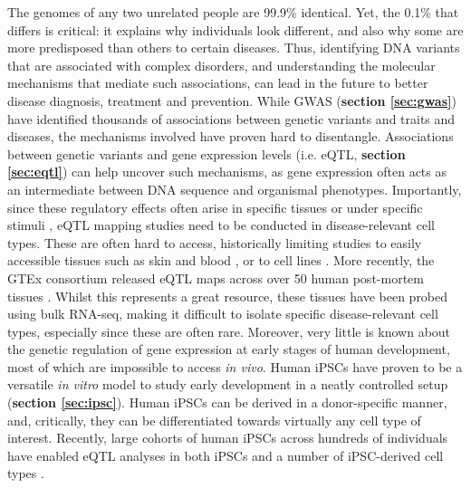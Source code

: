 The genomes of any two unrelated people are 99.9\% identical.
Yet, the 0.1\% that differs is critical: it explains why individuals look different, and also why some are more predisposed than others to certain diseases. 
Thus, identifying DNA variants that are associated with complex disorders, and understanding the molecular mechanisms that mediate such associations, can lead in the future to better disease diagnosis, treatment and prevention.
While GWAS (\textbf{section \ref{sec:gwas}}) have identified thousands of associations between genetic variants and traits and diseases, the mechanisms involved have proven hard to disentangle.
Associations between genetic variants and gene expression levels (i.e. eQTL, \textbf{section 
\ref{sec:eqtl}}) can help uncover such mechanisms, as gene expression often acts as an intermediate between DNA sequence and organismal phenotypes.
Importantly, since these regulatory effects often arise in specific tissues or under specific stimuli \cite{alasoo2018shared}, eQTL mapping studies need to be conducted in disease-relevant cell types. 
These are often hard to access, historically limiting studies to easily accessible tissues such as skin and blood \cite{fairfax2014innate, westra2014genome}, or to cell lines \cite{gibson2005quantitative}.
More recently, the GTEx consortium released eQTL maps across over 50 human post-mortem tissues \cite{aguet2019gtex}.
Whilst this represents a great resource, 
these tissues have been probed using bulk RNA-seq, making it difficult to isolate specific disease-relevant cell types, especially since these are often rare.
Moreover, 
very little is known about the genetic regulation of gene expression at early stages of human development, most of which are impossible to access \textit{in vivo}.
Human iPSCs have proven to be a versatile \textit{in vitro} model to study early development in a neatly controlled setup (\textbf{section 
\ref{sec:ipsc}}).
Human iPSCs can be derived in a donor-specific manner, and, critically, they can be differentiated towards virtually any cell type of interest.
Recently, large cohorts of human iPSCs across hundreds of individuals have enabled eQTL analyses in both iPSCs and a number of iPSC-derived cell types \cite{kilpinen2017common, schwartzentruber2018molecular}. 


